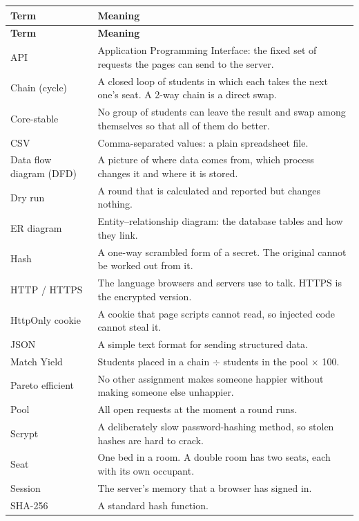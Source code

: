 \documentclass[11pt,a4paper,parskip=half,toc=listof]{scrreprt}
\begin{document}
\begin{xltabular}{\linewidth}{@{}L{3.5cm}Y@{}}
  \toprule
  \textbf{Term} & \textbf{Meaning}\\
  \midrule
  \endfirsthead
  \toprule
  \textbf{Term} & \textbf{Meaning}\\
  \midrule
  \endhead
  \bottomrule
  \endlastfoot
  API & Application Programming Interface: the fixed set of requests the
    pages can send to the server.\\
  Chain (cycle) & A closed loop of students in which each takes the next
    one's seat. A 2-way chain is a direct swap.\\
  Core-stable & No group of students can leave the result and swap among
    themselves so that all of them do better.\\
  CSV & Comma-separated values: a plain spreadsheet file.\\
  Data flow diagram (DFD) & A picture of where data comes from, which
    process changes it and where it is stored.\\
  Dry run & A round that is calculated and reported but changes nothing.\\
  ER diagram & Entity--relationship diagram: the database tables and how
    they link.\\
  Hash & A one-way scrambled form of a secret. The original cannot be
    worked out from it.\\
  HTTP / HTTPS & The language browsers and servers use to talk. HTTPS is
    the encrypted version.\\
  HttpOnly cookie & A cookie that page scripts cannot read, so injected
    code cannot steal it.\\
  JSON & A simple text format for sending structured data.\\
  Match Yield & Students placed in a chain $\div$ students in the pool
    $\times$ 100.\\
  Pareto efficient & No other assignment makes someone happier without
    making someone else unhappier.\\
  Pool & All open requests at the moment a round runs.\\
  Scrypt & A deliberately slow password-hashing method, so stolen hashes
    are hard to crack.\\
  Seat & One bed in a room. A double room has two seats, each with its
    own occupant.\\
  Session & The server's memory that a browser has signed in.\\
  SHA-256 & A standard hash function.\\

\end{xltabular}
\end{document}
